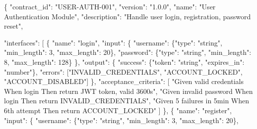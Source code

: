 \documentclass[
]{article}
\newenvironment{Shaded}{}{}
\newcommand{\DataTypeTok}[1]{\textcolor[rgb]{0.56,0.13,0.00}{#1}}
\newcommand{\DecValTok}[1]{\textcolor[rgb]{0.25,0.63,0.44}{#1}}
\newcommand{\FunctionTok}[1]{\textcolor[rgb]{0.02,0.16,0.49}{#1}}
\newcommand{\OtherTok}[1]{\textcolor[rgb]{0.00,0.44,0.13}{#1}}
\newcommand{\StringTok}[1]{\textcolor[rgb]{0.25,0.44,0.63}{#1}}
\begin{document}
\begin{Shaded}
\begin{Highlighting}[]
\FunctionTok{\{}
  \DataTypeTok{"contract\_id"}\FunctionTok{:} \StringTok{"USER{-}AUTH{-}001"}\FunctionTok{,}
  \DataTypeTok{"version"}\FunctionTok{:} \StringTok{"1.0.0"}\FunctionTok{,}
  \DataTypeTok{"name"}\FunctionTok{:} \StringTok{"User Authentication Module"}\FunctionTok{,}
  \DataTypeTok{"description"}\FunctionTok{:} \StringTok{"Handle user login, registration, password reset"}\FunctionTok{,}
  
  \DataTypeTok{"interfaces"}\FunctionTok{:} \OtherTok{[}
    \FunctionTok{\{}
      \DataTypeTok{"name"}\FunctionTok{:} \StringTok{"login"}\FunctionTok{,}
      \DataTypeTok{"input"}\FunctionTok{:} \FunctionTok{\{}
        \DataTypeTok{"username"}\FunctionTok{:} \FunctionTok{\{}\DataTypeTok{"type"}\FunctionTok{:} \StringTok{"string"}\FunctionTok{,} \DataTypeTok{"min\_length"}\FunctionTok{:} \DecValTok{3}\FunctionTok{,} \DataTypeTok{"max\_length"}\FunctionTok{:} \DecValTok{20}\FunctionTok{\},}
        \DataTypeTok{"password"}\FunctionTok{:} \FunctionTok{\{}\DataTypeTok{"type"}\FunctionTok{:} \StringTok{"string"}\FunctionTok{,} \DataTypeTok{"min\_length"}\FunctionTok{:} \DecValTok{8}\FunctionTok{,} \DataTypeTok{"max\_length"}\FunctionTok{:} \DecValTok{128}\FunctionTok{\}}
      \FunctionTok{\},}
      \DataTypeTok{"output"}\FunctionTok{:} \FunctionTok{\{}
        \DataTypeTok{"success"}\FunctionTok{:} \FunctionTok{\{}\DataTypeTok{"token"}\FunctionTok{:} \StringTok{"string"}\FunctionTok{,} \DataTypeTok{"expires\_in"}\FunctionTok{:} \StringTok{"number"}\FunctionTok{\},}
        \DataTypeTok{"errors"}\FunctionTok{:} \OtherTok{[}\StringTok{"INVALID\_CREDENTIALS"}\OtherTok{,} \StringTok{"ACCOUNT\_LOCKED"}\OtherTok{,} \StringTok{"ACCOUNT\_DISABLED"}\OtherTok{]}
      \FunctionTok{\},}
      \DataTypeTok{"acceptance\_criteria"}\FunctionTok{:} \OtherTok{[}
        \StringTok{"Given valid credentials When login Then return JWT token, valid 3600s"}\OtherTok{,}
        \StringTok{"Given invalid password When login Then return INVALID\_CREDENTIALS"}\OtherTok{,}
        \StringTok{"Given 5 failures in 5min When 6th attempt Then return ACCOUNT\_LOCKED"}
      \OtherTok{]}
    \FunctionTok{\}}\OtherTok{,}
    \FunctionTok{\{}
      \DataTypeTok{"name"}\FunctionTok{:} \StringTok{"register"}\FunctionTok{,}
      \DataTypeTok{"input"}\FunctionTok{:} \FunctionTok{\{}
        \DataTypeTok{"username"}\FunctionTok{:} \FunctionTok{\{}\DataTypeTok{"type"}\FunctionTok{:} \StringTok{"string"}\FunctionTok{,} \DataTypeTok{"min\_length"}\FunctionTok{:} \DecValTok{3}\FunctionTok{,} \DataTypeTok{"max\_length"}\FunctionTok{:} \DecValTok{20}\FunctionTok{\},}

\end{Highlighting}
\end{Shaded}
\end{document}
